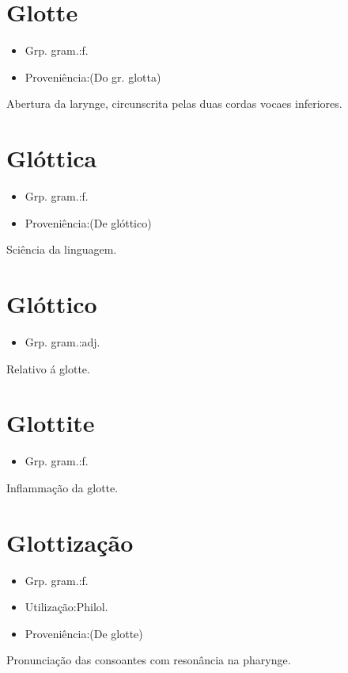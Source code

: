 \section{Glotte}
\begin{itemize}
\item {Grp. gram.:f.}
\end{itemize}
\begin{itemize}
\item {Proveniência:(Do gr. \textunderscore glotta\textunderscore )}
\end{itemize}
Abertura da larynge, circunscrita pelas duas cordas vocaes inferiores.
\section{Glóttica}
\begin{itemize}
\item {Grp. gram.:f.}
\end{itemize}
\begin{itemize}
\item {Proveniência:(De \textunderscore glóttico\textunderscore )}
\end{itemize}
Sciência da linguagem.
\section{Glóttico}
\begin{itemize}
\item {Grp. gram.:adj.}
\end{itemize}
Relativo á glotte.
\section{Glottite}
\begin{itemize}
\item {Grp. gram.:f.}
\end{itemize}
Inflammação da glotte.
\section{Glottização}
\begin{itemize}
\item {Grp. gram.:f.}
\end{itemize}
\begin{itemize}
\item {Utilização:Philol.}
\end{itemize}
\begin{itemize}
\item {Proveniência:(De \textunderscore glotte\textunderscore )}
\end{itemize}
Pronunciação das consoantes com resonância na pharynge.
